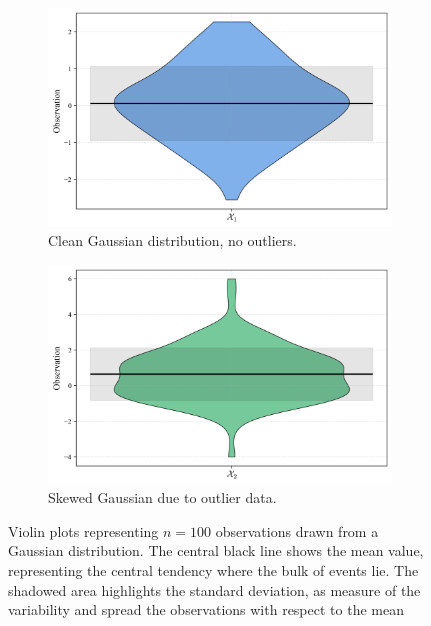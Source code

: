 \documentclass{book}
\begin{document}
\begin{figure}[ht]
    \centering
    \begin{subfigure}[b]{0.48\textwidth}
        \centering
        \includegraphics[width=\textwidth, height=0.7\textwidth]{figures/chapter1/violin_1.png}
        \caption{Clean Gaussian distribution, no outliers.}
        \label{fig:violin1}
    \end{subfigure}
    \hfill
    \begin{subfigure}[b]{0.48\textwidth}
        \centering
        \includegraphics[width=\textwidth, height=0.7\textwidth]{figures/chapter1/violin_2.png}
        \caption{Skewed Gaussian due to outlier data.}
        \label{fig:violin2}
    \end{subfigure}
    \caption{Violin plots representing $n = 100$ observations drawn from a Gaussian distribution. The central black line shows the mean value, representing the central tendency where the bulk of events lie. The shadowed area highlights the standard deviation, as measure of the variability and spread the observations with respect to the mean}
    \label{fig:violin_comparison}
\end{figure}
\end{document}

